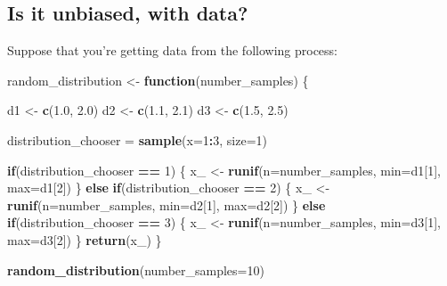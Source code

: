 \documentclass[
]{book}
\newenvironment{Shaded}{\begin{snugshade}}{\end{snugshade}}
\newcommand{\AttributeTok}[1]{\textcolor[rgb]{0.13,0.29,0.53}{#1}}
\newcommand{\ControlFlowTok}[1]{\textcolor[rgb]{0.13,0.29,0.53}{\textbf{#1}}}
\newcommand{\DecValTok}[1]{\textcolor[rgb]{0.00,0.00,0.81}{#1}}
\newcommand{\FloatTok}[1]{\textcolor[rgb]{0.00,0.00,0.81}{#1}}
\newcommand{\FunctionTok}[1]{\textcolor[rgb]{0.13,0.29,0.53}{\textbf{#1}}}
\newcommand{\NormalTok}[1]{#1}
\newcommand{\OtherTok}[1]{\textcolor[rgb]{0.56,0.35,0.01}{#1}}
\newcommand{\SpecialCharTok}[1]{\textcolor[rgb]{0.81,0.36,0.00}{\textbf{#1}}}
\theoremstyle{definition}
\theoremstyle{definition}
\theoremstyle{definition}
\theoremstyle{definition}
\theoremstyle{remark}
\begin{document}
\subsection{Is it unbiased, with data?}\label{is-it-unbiased-with-data}

Suppose that you're getting data from the following process:

\begin{Shaded}
\begin{Highlighting}[]
\NormalTok{random\_distribution }\OtherTok{\textless{}{-}} \ControlFlowTok{function}\NormalTok{(number\_samples) \{ }
  
\NormalTok{  d1 }\OtherTok{\textless{}{-}} \FunctionTok{c}\NormalTok{(}\FloatTok{1.0}\NormalTok{, }\FloatTok{2.0}\NormalTok{)}
\NormalTok{  d2 }\OtherTok{\textless{}{-}} \FunctionTok{c}\NormalTok{(}\FloatTok{1.1}\NormalTok{, }\FloatTok{2.1}\NormalTok{)}
\NormalTok{  d3 }\OtherTok{\textless{}{-}} \FunctionTok{c}\NormalTok{(}\FloatTok{1.5}\NormalTok{, }\FloatTok{2.5}\NormalTok{)}

\NormalTok{  distribution\_chooser }\OtherTok{=} \FunctionTok{sample}\NormalTok{(}\AttributeTok{x=}\DecValTok{1}\SpecialCharTok{:}\DecValTok{3}\NormalTok{, }\AttributeTok{size=}\DecValTok{1}\NormalTok{)}
  
  \ControlFlowTok{if}\NormalTok{(distribution\_chooser }\SpecialCharTok{==} \DecValTok{1}\NormalTok{) \{ }
\NormalTok{    x\_ }\OtherTok{\textless{}{-}} \FunctionTok{runif}\NormalTok{(}\AttributeTok{n=}\NormalTok{number\_samples, }\AttributeTok{min=}\NormalTok{d1[}\DecValTok{1}\NormalTok{], }\AttributeTok{max=}\NormalTok{d1[}\DecValTok{2}\NormalTok{])  }
\NormalTok{  \} }\ControlFlowTok{else} \ControlFlowTok{if}\NormalTok{(distribution\_chooser }\SpecialCharTok{==} \DecValTok{2}\NormalTok{) \{ }
\NormalTok{    x\_ }\OtherTok{\textless{}{-}} \FunctionTok{runif}\NormalTok{(}\AttributeTok{n=}\NormalTok{number\_samples, }\AttributeTok{min=}\NormalTok{d2[}\DecValTok{1}\NormalTok{], }\AttributeTok{max=}\NormalTok{d2[}\DecValTok{2}\NormalTok{]) }
\NormalTok{  \} }\ControlFlowTok{else} \ControlFlowTok{if}\NormalTok{(distribution\_chooser }\SpecialCharTok{==} \DecValTok{3}\NormalTok{) \{ }
\NormalTok{    x\_ }\OtherTok{\textless{}{-}} \FunctionTok{runif}\NormalTok{(}\AttributeTok{n=}\NormalTok{number\_samples, }\AttributeTok{min=}\NormalTok{d3[}\DecValTok{1}\NormalTok{], }\AttributeTok{max=}\NormalTok{d3[}\DecValTok{2}\NormalTok{])}
\NormalTok{  \}}
  \FunctionTok{return}\NormalTok{(x\_)}
\NormalTok{\}}

\FunctionTok{random\_distribution}\NormalTok{(}\AttributeTok{number\_samples=}\DecValTok{10}\NormalTok{)}
\end{Highlighting}
\end{Shaded}
\end{document}
